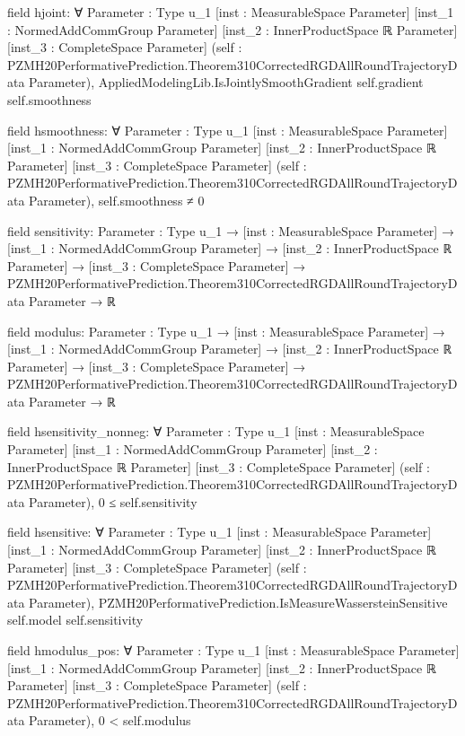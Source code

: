 \documentclass[10pt]{article}
\begin{document}
\begin{ReviewVerbatim}
field hjoint:
∀ {Parameter : Type u_1} [inst : MeasurableSpace Parameter] [inst_1 : NormedAddCommGroup Parameter]
  [inst_2 : InnerProductSpace ℝ Parameter] [inst_3 : CompleteSpace Parameter]
  (self : PZMH20PerformativePrediction.Theorem310CorrectedRGDAllRoundTrajectoryData Parameter),
  AppliedModelingLib.IsJointlySmoothGradient self.gradient self.smoothness

field hsmoothness:
∀ {Parameter : Type u_1} [inst : MeasurableSpace Parameter] [inst_1 : NormedAddCommGroup Parameter]
  [inst_2 : InnerProductSpace ℝ Parameter] [inst_3 : CompleteSpace Parameter]
  (self : PZMH20PerformativePrediction.Theorem310CorrectedRGDAllRoundTrajectoryData Parameter), self.smoothness ≠ 0

field sensitivity:
{Parameter : Type u_1} →
  [inst : MeasurableSpace Parameter] →
    [inst_1 : NormedAddCommGroup Parameter] →
      [inst_2 : InnerProductSpace ℝ Parameter] →
        [inst_3 : CompleteSpace Parameter] →
          PZMH20PerformativePrediction.Theorem310CorrectedRGDAllRoundTrajectoryData Parameter → ℝ

field modulus:
{Parameter : Type u_1} →
  [inst : MeasurableSpace Parameter] →
    [inst_1 : NormedAddCommGroup Parameter] →
      [inst_2 : InnerProductSpace ℝ Parameter] →
        [inst_3 : CompleteSpace Parameter] →
          PZMH20PerformativePrediction.Theorem310CorrectedRGDAllRoundTrajectoryData Parameter → ℝ

field hsensitivity_nonneg:
∀ {Parameter : Type u_1} [inst : MeasurableSpace Parameter] [inst_1 : NormedAddCommGroup Parameter]
  [inst_2 : InnerProductSpace ℝ Parameter] [inst_3 : CompleteSpace Parameter]
  (self : PZMH20PerformativePrediction.Theorem310CorrectedRGDAllRoundTrajectoryData Parameter), 0 ≤ self.sensitivity

field hsensitive:
∀ {Parameter : Type u_1} [inst : MeasurableSpace Parameter] [inst_1 : NormedAddCommGroup Parameter]
  [inst_2 : InnerProductSpace ℝ Parameter] [inst_3 : CompleteSpace Parameter]
  (self : PZMH20PerformativePrediction.Theorem310CorrectedRGDAllRoundTrajectoryData Parameter),
  PZMH20PerformativePrediction.IsMeasureWassersteinSensitive self.model self.sensitivity

field hmodulus_pos:
∀ {Parameter : Type u_1} [inst : MeasurableSpace Parameter] [inst_1 : NormedAddCommGroup Parameter]
  [inst_2 : InnerProductSpace ℝ Parameter] [inst_3 : CompleteSpace Parameter]
  (self : PZMH20PerformativePrediction.Theorem310CorrectedRGDAllRoundTrajectoryData Parameter), 0 < self.modulus


\end{ReviewVerbatim}
\end{document}
